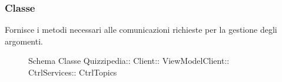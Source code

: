 \subsubsection{Classe }
Fornisce i metodi necessari alle comunicazioni richieste per la gestione degli argomenti.
\begin{figure}[H]
\centering
\noindent{}
\caption[Schema Classe CtrlTopics]{Schema Classe Quizzipedia:: Client:: ViewModelClient:: CtrlServices:: CtrlTopics}
\end{figure}
